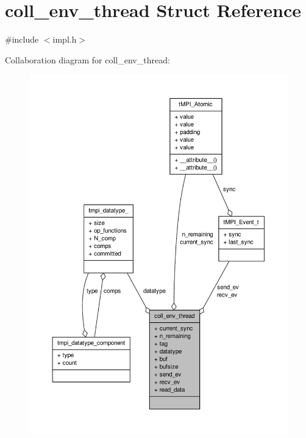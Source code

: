 \hypertarget{structcoll__env__thread}{\section{coll\-\_\-env\-\_\-thread \-Struct \-Reference}
\label{structcoll__env__thread}
}


{\ttfamily \#include $<$impl.\-h$>$}



\-Collaboration diagram for coll\-\_\-env\-\_\-thread\-:
\nopagebreak
\begin{figure}[H]
\begin{center}
\leavevmode
\includegraphics[width=350pt]{structcoll__env__thread__coll__graph}
\end{center}
\end{figure}
